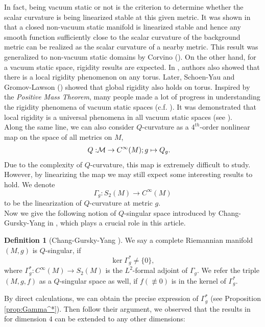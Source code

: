 \documentclass[12pt]{amsart}
\theoremstyle{definition}
\newtheorem{definition}[theorem]{Definition}
\theoremstyle{remark}
\numberwithin{equation}{section}
\begin{document}
In fact, being vacuum static or not is the criterion to determine whether the scalar curvature is being linearized stable at this given metric. It was shown in \cite{F-M} that a closed non-vacuum static manifold is linearized stable and hence any smooth function sufficiently close to the scalar curvature of the background metric can be realized as the scalar curvature of a nearby metric. This result was generalized to non-vacuum static domains by Corvino (\cite{Corvino}). On the other hand, for a vacuum static space, rigidity results are expected. In \cite{F-M}, authors also showed that there is a local rigidity phenomenon on any torus. Later, Schoen-Yau and Gromov-Lawson (\cite{S-Y_1, S-Y_2, G-L_1, G-L_2}) showed that global rigidity also holds on torus. Inspired by the \emph{Positive Mass Theorem}, many people made a lot of progress in understanding the rigidity phenomena of vacuum static spaces (c.f. \cite{Min-Oo, A-D, A-C-G, Miao, S-T, B-M}). It was demonstrated that local rigidity is a universal phenomena in all vacuum static spaces (see \cite{Q-Y_1}).  \\

Along the same line, we can also consider $Q$-curvature as a $4^{th}$-order nonlinear map on the space of all metrics on $M$, 
\begin{align}
\notag
Q: &\mathcal{M} \rightarrow C^{\infty}(M); g\mapsto Q_g.
\end{align}
Due to the complexity of $Q$-curvature, this map is extremely difficult to study. However, by linearizing the map we may still expect some interesting results to hold. We denote $$\Gamma_g : S_2(M) \rightarrow C^\infty(M)$$ to be the linearization of $Q$-curvature at metric $g$. \\

Now we give the following notion of $Q$-singular space introduced by Chang-Gursky-Yang in \cite{C-G-Y}, which plays a crucial role in this article.

\begin{definition}[Chang-Gursky-Yang \cite{C-G-Y}]
We say a complete Riemannian manifold $(M, g)$ is $Q$-singular, if $$\ker \Gamma_g^* \neq \{ 0 \},$$ where
$\Gamma_g^* : C^\infty(M) \rightarrow S_2(M)$ is the $L^2$-formal adjoint of $\Gamma_g$. We refer the triple $(M, g, f)$ as a $Q$-singular space as well, if $f (\not\equiv 0)$ is in the kernel of $\Gamma_g^*$.
\end{definition}

By direct calculations, we can obtain the precise expression of $\Gamma_g^*$ (see Proposition \ref{prop:Gamma^*}). Then follow their argument, we observed that the results in \cite{C-G-Y} for dimension $4$ can be extended to any other dimensions:
\end{document}
